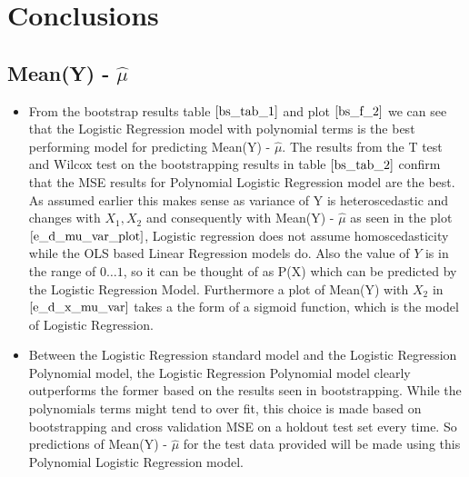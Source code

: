 \documentclass[twoside,12pt]{article}
\begin{document}
\FloatBarrier
\section{Conclusions}
\label{Conclusions}

\subsection{Mean(Y) - $\hat{\mu}$}
\FloatBarrier
\begin{itemize}
\item
From the bootstrap results table $\eqref{bs_tab_1}$ and plot $\eqref{bs_f_2}$ we can see that the Logistic Regression model with polynomial terms is the best performing model for predicting Mean(Y) - $\hat{\mu}$. The results from the T test and Wilcox test on the bootstrapping results in table $\eqref{bs_tab_2}$ confirm that the MSE results for  Polynomial Logistic Regression model are the best. As assumed earlier this makes sense as variance of Y is heteroscedastic and changes with $X_1,X_2$ and consequently with Mean(Y) - $\hat{\mu}$ as seen in the plot $\eqref{e_d_mu_var_plot}$, Logistic regression does not assume homoscedasticity while the OLS based Linear Regression models do. Also the value of $Y$ is in the range of $0 \dots 1 $, so it can be thought of as P(X) which can be predicted by the Logistic Regression Model. Furthermore a plot of Mean(Y) with $X_2$ in $\eqref{e_d_x_mu_var}$ takes a the form of a sigmoid function, which is the model of Logistic Regression.
\item
Between the Logistic Regression standard model and the Logistic Regression Polynomial model, the Logistic Regression Polynomial model clearly outperforms the former based on the results seen in bootstrapping. While the polynomials terms might tend to over fit, this choice is made based on bootstrapping and cross validation MSE on a holdout test set every time. So predictions of Mean(Y) - $\hat{\mu}$ for the test data provided will be made using this Polynomial Logistic Regression model.
\end{itemize}
\end{document}
